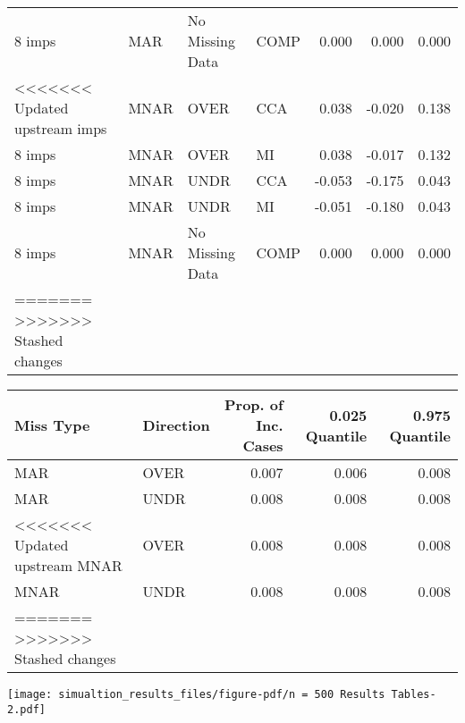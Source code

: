 \documentclass[
  letterpaper,
  DIV=11,
  numbers=noendperiod]{scrartcl}
\begin{document}
\begin{tabular}[t]{llllrrr}
8 imps & MAR & No Missing Data & COMP & 0.000 & 0.000 & 0.000\\
<<<<<<< Updated upstream
\addlinespace
8 imps & MNAR & OVER & CCA & 0.038 & -0.020 & 0.138\\
8 imps & MNAR & OVER & MI & 0.038 & -0.017 & 0.132\\
8 imps & MNAR & UNDR & CCA & -0.053 & -0.175 & 0.043\\
8 imps & MNAR & UNDR & MI & -0.051 & -0.180 & 0.043\\
8 imps & MNAR & No Missing Data & COMP & 0.000 & 0.000 & 0.000\\
=======
>>>>>>> Stashed changes
\bottomrule
\end{tabular}

\begin{tabular}[t]{llrrr}
\toprule
Miss Type & Direction & Prop. of Inc. Cases & 0.025 Quantile & 0.975 Quantile\\
\midrule
MAR & OVER & 0.007 & 0.006 & 0.008\\
MAR & UNDR & 0.008 & 0.008 & 0.008\\
<<<<<<< Updated upstream
MNAR & OVER & 0.008 & 0.008 & 0.008\\
MNAR & UNDR & 0.008 & 0.008 & 0.008\\
=======
>>>>>>> Stashed changes
\bottomrule
\end{tabular}

\texttt{[image: simualtion\_results\_files/figure-pdf/n = 500 Results Tables-2.pdf]}
\end{document}
